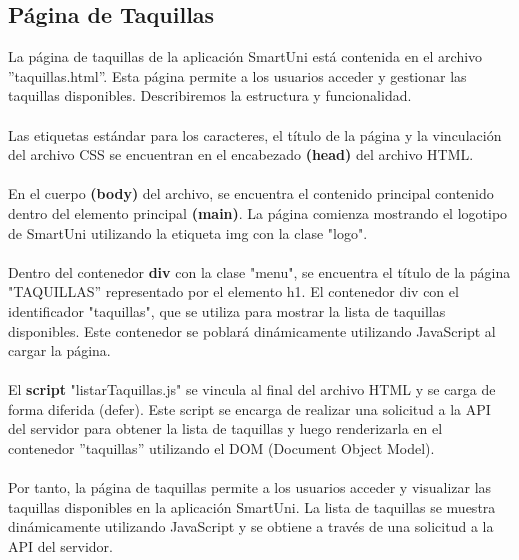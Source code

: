 \documentclass[12pt]{report}
\begin{document}
\subsection{Página de Taquillas}
La página de taquillas de la aplicación SmartUni está contenida en el archivo ''taquillas.html''. Esta página permite a los usuarios acceder y gestionar las taquillas disponibles. Describiremos la estructura y funcionalidad.
\\\\
Las etiquetas estándar para los caracteres, el título de la página y la vinculación del archivo CSS se encuentran en el encabezado \textbf{ (head)} del archivo HTML.
\\\\
En el cuerpo \textbf{(body)} del archivo, se encuentra el contenido principal contenido dentro del elemento principal \textbf{(main)}. La página comienza mostrando el logotipo de SmartUni utilizando la etiqueta img con la clase "logo".\\\\
Dentro del contenedor \textbf{div} con la clase "menu", se encuentra el título de la página "TAQUILLAS'' representado por el elemento h1.
El contenedor div con el identificador "taquillas", que se utiliza para mostrar la lista de taquillas disponibles. Este contenedor se poblará dinámicamente utilizando JavaScript al cargar la página.
\\\\
El \textbf{script} "listarTaquillas.js" se vincula al final del archivo HTML y se carga de forma diferida (defer). Este script se encarga de realizar una solicitud a la API del servidor para obtener la lista de taquillas y luego renderizarla en el contenedor ''taquillas'' utilizando el DOM (Document Object Model).
\\\\
Por tanto,  la página de taquillas permite a los usuarios acceder y visualizar las taquillas disponibles en la aplicación SmartUni. La lista de taquillas se muestra dinámicamente utilizando JavaScript y se obtiene a través de una solicitud a la API del servidor.
\end{document}
